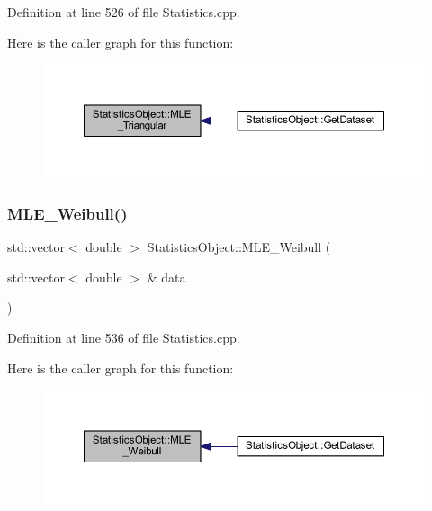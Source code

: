 Definition at line 526 of file Statistics.\+cpp.

Here is the caller graph for this function\+:
\nopagebreak
\begin{figure}[H]
\begin{center}
\leavevmode
\includegraphics[width=350pt]{class_statistics_object_aecf3e116092cfcfd2a44e1a1936f7b9d_icgraph}
\end{center}
\end{figure}
\mbox{\label{class_statistics_object_ad4af7e6da209156c12ee1a5d2c9071bb}} 
\subsubsection{\texorpdfstring{M\+L\+E\+\_\+\+Weibull()}{MLE\_Weibull()}}
{\footnotesize\ttfamily std\+::vector$<$ double $>$ Statistics\+Object\+::\+M\+L\+E\+\_\+\+Weibull (\begin{DoxyParamCaption}\item[{std\+::vector$<$ double $>$ \&}]{data }\end{DoxyParamCaption})\hspace{0.3cm}{\ttfamily [protected]}}



Definition at line 536 of file Statistics.\+cpp.

Here is the caller graph for this function\+:
\nopagebreak
\begin{figure}[H]
\begin{center}
\leavevmode
\includegraphics[width=350pt]{class_statistics_object_ad4af7e6da209156c12ee1a5d2c9071bb_icgraph}
\end{center}
\end{figure}
\mbox{\label{class_statistics_object_ade153b4af992cc1df2c515cde8e01ef9}} 

